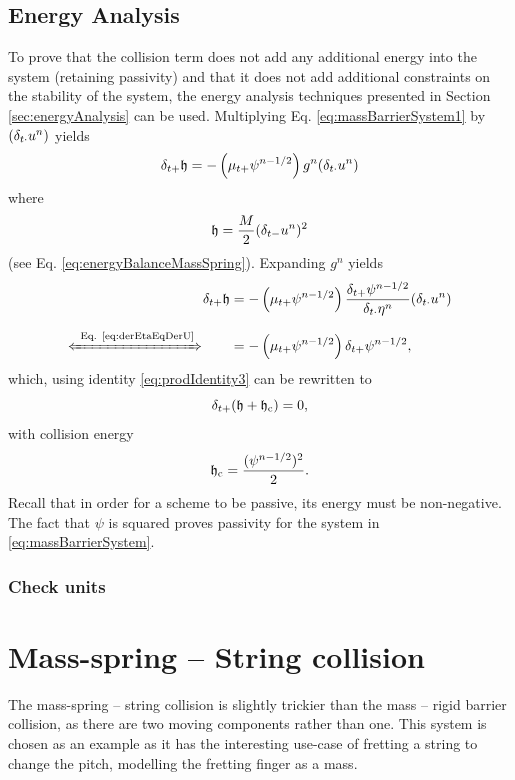 \subsection{Energy Analysis}
To prove that the collision term does not add any additional energy into the system (retaining passivity) and that it does not add additional constraints on the stability of the system, the energy analysis techniques presented in Section \ref{sec:energyAnalysis} can be used. Multiplying Eq. \eqref{eq:massBarrierSystem1} by $(\delta_{t\cdot} u^n)$ yields 
\begin{equation*}
    \delta_{t+} \mathfrak{h}  = -\left(\mu_{t+}\psi^{n-1/2}\right)g^n (\delta_{t\cdot} u^n)
\end{equation*}
where
\begin{equation}
    \mathfrak{h} = \frac{M}{2}(\delta_{t-}u^n)^2
\end{equation}
(see Eq. \eqref{eq:energyBalanceMassSpring}). Expanding $g^n$ yields 
\begin{align*}
    \dtp \h  &= -\left(\mtp\psi^{n-1/2}\right)\frac{\dtp \psi^{n-1/2}}{\dtd \eta^n}(\dtd \un)\\
    \xLeftrightarrow{\mystrut\ \text{Eq. \eqref{eq:derEtaEqDerU}}} \qquad & = -\left(\mtp\psi^{n-1/2}\right)\dtp \psi^{n-1/2},
\end{align*}
which, using identity \eqref{eq:prodIdentity3} can be rewritten to 
\begin{equation}
    \delta_{t+}(\mathfrak{h} + \mathfrak{h}_{\text{c}}) = 0,
\end{equation}
with collision energy
\begin{equation}\label{eq:collisionEnergy}
    \mathfrak{h}_{\text{c}} = \frac{(\psi^{n-1/2})^2}{2}.
\end{equation}
Recall that in order for a scheme to be passive, its energy must be non-negative. The fact that $\psi$ is squared proves passivity for the system in \eqref{eq:massBarrierSystem}.

\subsubsection{Check units}


\section{Mass-spring -- String collision}\label{sec:massString}
The mass-spring -- string collision is slightly trickier than the mass -- rigid barrier collision, as there are two moving components rather than one. This system is chosen as an example as it has the interesting use-case of fretting a string to change the pitch, modelling the fretting finger as a mass.

